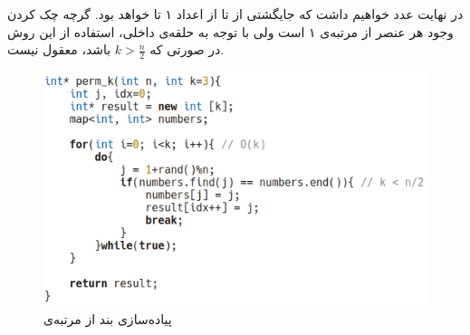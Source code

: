 \documentclass{article}
\begin{document}
در نهایت
عدد خواهیم داشت که جایگشتی از
تا از اعداد ۱ تا
خواهد بود. گرچه چک کردن وجود هر عنصر از مرتبه‌ی ۱ است ولی با توجه به حلقه‌ی
داخلی، استفاده از این روش در صورتی که 
$k > \frac{n}{2}$
باشد، معقول نیست.
\begin{figure}[H]
    \centering
    \includegraphics[width=0.6\linewidth]{Photos/HW2/c.png}
    \caption{
    پیاده‌سازی بند
    از مرتبه‌ی
    }
    \label{fig:my_label}
\end{figure}
\end{document}
